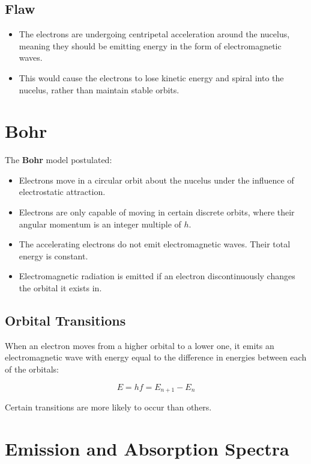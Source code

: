 \documentclass[a4paper,11pt]{report}
\begin{document}
\subsection{Flaw}

\begin{itemize}
\item The electrons are undergoing centripetal acceleration around the nucelus,
	meaning they should be emitting energy in the form of electromagnetic waves.
\item This would cause the electrons to lose kinetic energy and spiral into the
	nucelus, rather than maintain stable orbits.
\end{itemize}


\section{Bohr}

The \textbf{Bohr} model postulated:

\begin{itemize}
\item Electrons move in a circular orbit about the nucelus under the influence
	of electrostatic attraction.
\item Electrons are only capable of moving in certain discrete orbits, where
	their angular momentum is an integer multiple of $h$.
\item The accelerating electrons do not emit electromagnetic waves. Their
	total energy is constant.
\item Electromagnetic radiation is emitted if an electron discontinuously
	changes the orbital it exists in.
\end{itemize}

\subsection{Orbital Transitions}


When an electron moves from a higher orbital to a lower one, it emits an
electromagnetic wave with energy equal to the difference in energies between
each of the orbitals:

$$
E = hf = E_{n + 1} - E_n
$$

Certain transitions are more likely to occur than others.


\section{Emission and Absorption Spectra}
\end{document}
